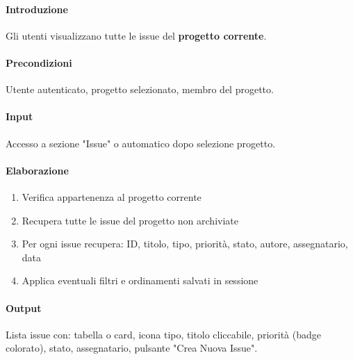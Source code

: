 \vspace{0.5cm}

\newpage


\begin{reqbox}[title=REQ-FUN-10: Visualizza Lista Issue]
\label{subsubsec:req-visualizza-lista-issue}

\paragraph{Introduzione}
Gli utenti visualizzano tutte le issue del \textbf{progetto corrente}.

\paragraph{Precondizioni}
Utente autenticato, progetto selezionato, membro del progetto.

\paragraph{Input}
Accesso a sezione "Issue" o automatico dopo selezione progetto.

\paragraph{Elaborazione}
\begin{enumerate}[leftmargin=1.1em]
\item Verifica appartenenza al progetto corrente
\item Recupera tutte le issue del progetto non archiviate
\item Per ogni issue recupera: ID, titolo, tipo, priorità, stato, autore, assegnatario, data
\item Applica eventuali filtri e ordinamenti salvati in sessione
\end{enumerate}

\paragraph{Output}
Lista issue con: tabella o card, icona tipo, titolo cliccabile, priorità (badge colorato), stato, assegnatario, pulsante "Crea Nuova Issue".

\end{reqbox}

